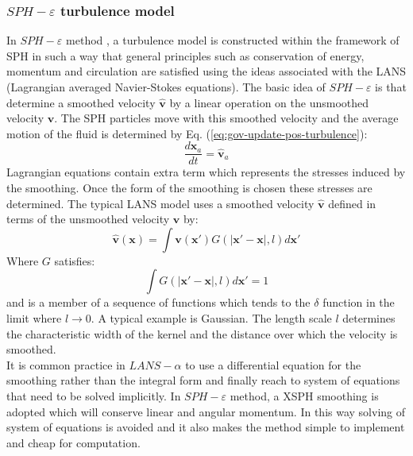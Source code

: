 \documentclass[journal abbreviation, manuscript]{copernicus}
\begin{document}
\subsubsection{$SPH-\varepsilon$ turbulence model}
In $SPH-\varepsilon$ method \citep{monaghan2011turbulence}, a turbulence model is constructed within the framework of SPH in such a way that general principles such as conservation of energy, momentum and circulation are satisfied using the ideas associated with the LANS (Lagrangian averaged Navier-Stokes equations). The basic idea of $SPH-\varepsilon$ is that determine a smoothed velocity $\widehat{\textbf{v}}$ by a linear operation on the unsmoothed velocity $\textbf{v}$. The SPH particles move with this smoothed velocity and the average motion of the fluid is determined by Eq. (\ref{eq:gov-update-pos-turbulence}):
\begin{equation}
\dfrac{d \textbf{x}_a}{dt} = \widehat{\textbf{v}}_a \label{eq:gov-update-pos-turbulence}
\end{equation}
Lagrangian equations contain extra term which represents the stresses induced by the smoothing. Once the form of the smoothing is chosen these stresses are determined. 
The typical LANS model uses a smoothed velocity $\widehat{\textbf{v}}$ 
defined in terms of the unsmoothed velocity $\textbf{v}$ by:
\begin{equation}
\widehat{\textbf{v}}(\textbf{x})=\int \textbf{v}(\textbf{x} \prime)G(\vert \textbf{x} \prime - \textbf{x} \vert, l) d\textbf{x} \prime
\end{equation}
Where $G$ satisfies:
\begin{equation}
\int G(\vert \textbf{x} \prime - \textbf{x} \vert, l) d\textbf{x} \prime =1
\end{equation}
and is a member of a sequence of functions which tends to the $\delta$ function in the limit where $ l\rightarrow 0$. A typical example is Gaussian.
The length scale $l$ determines the characteristic width of the kernel and the distance over which the velocity is smoothed.\\
It is common practice in $LANS-\alpha$ to use a differential equation for the smoothing rather than the integral form and finally reach to system of equations that need to be solved implicitly. In $SPH-\varepsilon$ method, a XSPH smoothing is adopted which will conserve linear and angular momentum. In this way solving of system of equations is avoided and it also makes the method simple to implement and cheap for computation. 
\end{document}
